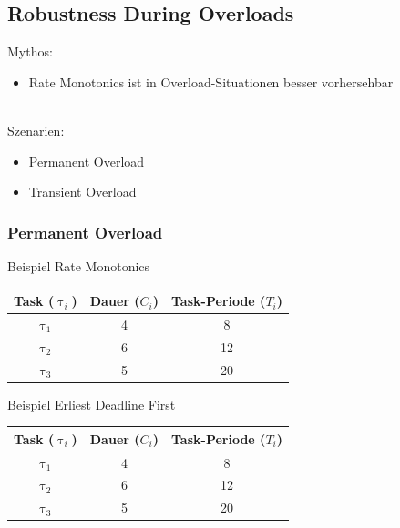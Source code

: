 \subsection{Robustness During Overloads}\label{RobustnessDuringOverloads}

\begin{frame}{\subsecname}
	Mythos:
	\begin{itemize}
		\item Rate Monotonics ist in Overload-Situationen besser vorhersehbar
	\end{itemize}$ $\\\pause
	Szenarien:
	\begin{itemize}
		\item Permanent Overload
		\item Transient Overload
	\end{itemize}
\end{frame}

\subsubsection{Permanent Overload}
\begin{frame}{Beispiel Rate Monotonics}
	\begin{center}
		\begin{tabular}{c||c|c}
			Task ($\uptau_i$) & Dauer ($C_i$) & Task-Periode ($T_i$)\\\hline\hline
			$\uptau_1$ & 4 & 8\\
			$\uptau_2$ & 6 & 12\\
			$\uptau_3$ & 5 & 20
		\end{tabular}
	\end{center}
	
\end{frame}

\begin{frame}{Beispiel Erliest Deadline First}
	\begin{center}
		\begin{tabular}{c||c|c}
			Task ($\uptau_i$) & Dauer ($C_i$) & Task-Periode ($T_i$)\\\hline\hline
			$\uptau_1$ & 4 & 8\\
			$\uptau_2$ & 6 & 12\\
			$\uptau_3$ & 5 & 20
		\end{tabular}
	\end{center}
	
\end{frame}

